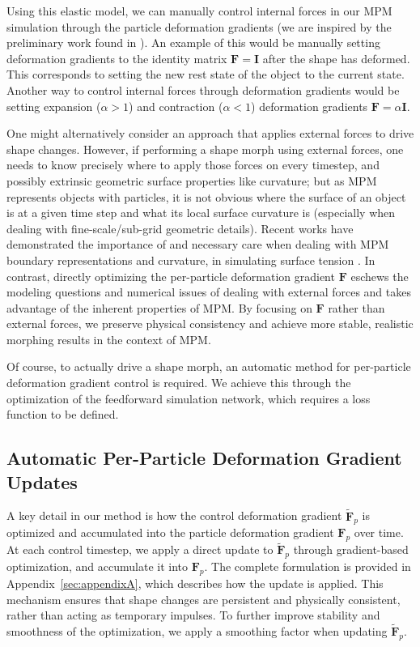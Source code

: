     Using this elastic model, we can manually control internal forces in our {MPM} simulation through the particle deformation gradients (we are inspired by the preliminary work found in \citep{10.1145/3606037.3606840}).
    An example of this would be manually setting deformation gradients to the identity matrix $\mathbf{F} = \mathbf{I}$ after the shape has deformed. 
    This corresponds to setting the new rest state of the object to the current state. 
    Another way to control internal forces through deformation gradients would be setting expansion ($\alpha > 1$) and contraction ($\alpha < 1$) deformation gradients $\mathbf{F} = \alpha \mathbf{I}$.
    
    One might alternatively consider an approach that applies external forces to drive shape changes.
    However, if performing a shape morph using external forces, one needs to know precisely where to apply those forces on every timestep, and possibly extrinsic geometric surface properties like curvature; but as MPM represents objects with particles, it is not obvious where the surface of an object is at a given time step and what its local surface curvature is (especially when dealing with fine-scale/sub-grid geometric details).  Recent works have demonstrated the importance of and necessary care when dealing with MPM boundary representations and curvature, in simulating surface tension \citep{implicit_mpm_surface_tension,conservative_surface_tension}.    
    In contrast, directly optimizing the per-particle deformation gradient $\mathbf{F}$ eschews the modeling questions and numerical issues of dealing with external forces and takes advantage of the inherent properties of MPM.
    By focusing on $\mathbf{F}$ rather than external forces, we preserve physical consistency and achieve more stable, realistic morphing results in the context of MPM.
    
    Of course, to actually drive a shape morph, an automatic method for per-particle deformation gradient control is required.
    We achieve this through the optimization of the feedforward simulation network, which requires a loss function to be defined.

\subsection{Automatic Per-Particle Deformation Gradient Updates}
    \label{sec:control-updates}
    
    A key detail in our method is how the control deformation gradient $\tilde{\mathbf{F}}_p$ is optimized and accumulated into the particle deformation gradient $\mathbf{F}_p$ over time. 
    At each control timestep, we apply a direct update to $\tilde{\mathbf{F}}_p$ through gradient-based optimization, and accumulate it into $\mathbf{F}_p$. 
    The complete formulation is provided in Appendix~\ref{sec:appendixA}, which describes how the update is applied.
    This mechanism ensures that shape changes are persistent and physically consistent, rather than acting as temporary impulses. 
    To further improve stability and smoothness of the optimization, we apply a smoothing factor when updating $\tilde{\mathbf{F}}_p$.

